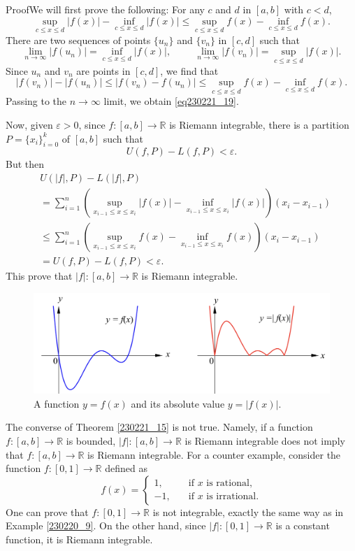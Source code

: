 \begin{myproof}{Proof}We will first prove the following: For any $c$ and $d$ in $[a,b]$ with $c<d$,
\begin{equation}\label{eq230221_19}\sup_{c\leq x\leq d}|f(x)|-\inf_{c\leq x\leq d}|f(x)|\leq  \sup_{c\leq x\leq d}f(x) -\inf_{c\leq x\leq d}f(x).\end{equation}
 There are two sequences of points $\{u_n\}$ and $\{v_n\}$ in $[c,d]$ such that
\[\lim_{n\to\infty}|f(u_n)|=\inf_{c\leq x\leq d}|f(x)|,\hspace{1cm}\lim_{n\to\infty}|f(v_n)|=\sup_{c\leq x\leq d}|f(x)|.\]\bp
Since $u_n$ and $v_n$ are points in $[c,d]$, we find that
\[|f(v_n)|-|f(u_n)|\leq|f(v_n)-f(u_n)|\leq \sup_{c\leq x\leq d}f(x) -\inf_{c\leq x\leq d}f(x).\]
Passing to the $n\to\infty$ limit, we obtain \eqref{eq230221_19}.

 
 
Now, given $\varepsilon>0$, since $f:[a,b]\to\mathbb{R}$ is Riemann integrable, there is a partition $P=\{x_i\}_{i=0}^k$ of $[a,b]$ such that 
\[U(f,P)-L(f,P) <\varepsilon.\]
But then \begin{align*}
&U(|f|,P)-L(|f|,P)\\&=\sum_{i=1}^n\left(\sup_{x_{i-1}\leq x\leq x_i}|f(x)|-\inf_{x_{i-1}\leq x\leq x_i}|f(x)|\right)(x_i-x_{i-1})\\
&\leq \sum_{i=1}^n\left(\sup_{x_{i-1}\leq x\leq x_i}f(x)-\inf_{x_{i-1}\leq x\leq x_i}f(x)\right)(x_i-x_{i-1})\\&=U(f,P)-L(f,P)<\varepsilon.\end{align*}This prove that $|f|:[a,b]\to\mathbb{R}$ is Riemann integrable.
\end{myproof}

\begin{figure}[ht]
\centering
\includegraphics[scale=0.2]{Picture44.png}
\caption{A function $y=f(x)$ and its absolute value $y=|f(x)|$.\fa}\label{figure44}
\end{figure}
\begin{remark}{}
The converse of Theorem \ref{230221_15} is not true. Namely, if a function $f:[a,b]\to\mathbb{R}$ is bounded, $|f|:[a,b]\to\mathbb{R}$ is Riemann integrable does not imply that $f:[a,b]\to\mathbb{R}$ is Riemann integrable. For a counter example, consider the function $f:[0,1]\to\mathbb{R}$ defined as
\[f(x)=\begin{cases} 1,\quad &\text{if $x$ is rational},\\-1,\quad & \text{if $x$ is irrational}.\end{cases} \]
One can prove that $f:[0,1]\to\mathbb{R}$ is not integrable, exactly the same way as in Example \ref{230220_9}. On the other hand, since $|f|:[0,1]\to\mathbb{R}$ is a constant function, it is Riemann integrable.
\end{remark}


